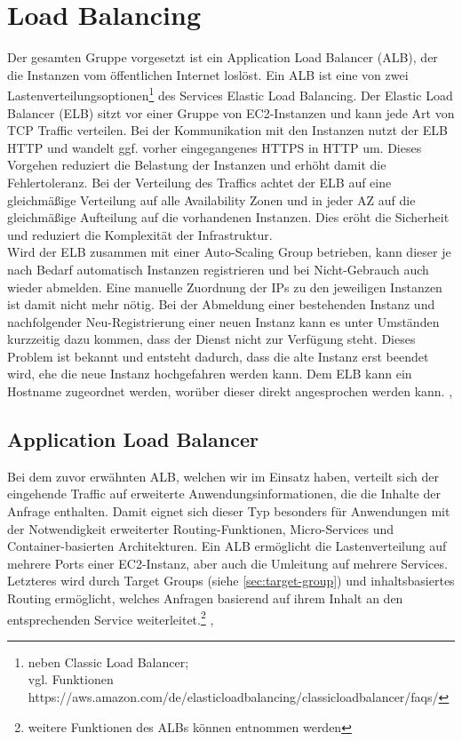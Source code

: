 \section{Load Balancing}
\label{sec:elb}
Der gesamten Gruppe vorgesetzt ist ein Application Load Balancer (ALB), der die Instanzen vom öffentlichen Internet loslöst. Ein ALB ist eine von zwei Lastenverteilungsoptionen\footnote{neben Classic Load Balancer; \\vgl. Funktionen https://aws.amazon.com/de/elasticloadbalancing/classicloadbalancer/faqs/} des Services Elastic Load Balancing.
Der Elastic Load Balancer (ELB) sitzt vor einer Gruppe von EC2-Instanzen und kann jede Art von TCP Traffic verteilen. Bei der Kommunikation mit den Instanzen nutzt der ELB HTTP und wandelt ggf. vorher eingegangenes HTTPS in HTTP um. Dieses Vorgehen reduziert die Belastung der Instanzen und erhöht damit die Fehlertoleranz. Bei der Verteilung des Traffics achtet der ELB auf eine gleichmäßige Verteilung auf alle Availability Zonen und in jeder AZ auf die gleichmäßige Aufteilung auf die vorhandenen Instanzen. Dies eröht die Sicherheit und reduziert die Komplexität der Infrastruktur.
\\ Wird der ELB zusammen mit einer Auto-Scaling Group betrieben, kann dieser je nach Bedarf automatisch Instanzen registrieren und bei Nicht-Gebrauch auch wieder abmelden. Eine manuelle Zuordnung der IPs zu den jeweiligen Instanzen ist damit nicht mehr nötig. Bei der Abmeldung einer bestehenden Instanz und nachfolgender Neu-Registrierung einer neuen Instanz kann es unter Umständen kurzzeitig dazu kommen, dass der Dienst nicht zur Verfügung steht. Dieses Problem ist bekannt und entsteht dadurch, dass die alte Instanz erst beendet wird, ehe die neue Instanz hochgefahren werden kann.
Dem ELB kann ein Hostname zugeordnet werden, worüber dieser direkt angesprochen werden kann.
\cite{vliet:resilience}, \cite{aws:elb} \\

\subsection{Application Load Balancer}
\label{sec:alb}
Bei dem zuvor erwähnten ALB, welchen wir im Einsatz haben, verteilt sich der eingehende Traffic auf erweiterte Anwendungsinformationen, die die Inhalte der Anfrage enthalten. Damit eignet sich dieser Typ besonders für Anwendungen mit der Notwendigkeit erweiterter Routing-Funktionen, Micro-Services und Container-basierten Architekturen. Ein ALB ermöglicht die Lastenverteilung auf mehrere Ports einer EC2-Instanz, aber auch die Umleitung auf mehrere Services. Letzteres wird durch Target Groups (siehe \ref{sec:target-group}) und inhaltsbasiertes Routing ermöglicht, welches Anfragen basierend auf ihrem Inhalt an den entsprechenden Service weiterleitet.\footnote{weitere Funktionen des ALBs können \cite{aws:alb} entnommen werden} \cite{aws:elb}, \cite{aws:alb}


